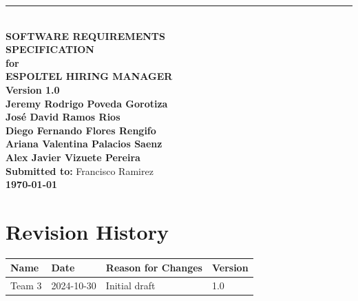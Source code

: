 \documentclass{scrreprt}
\date{November 14, 2024}
\def\myversion{1.0 }
\begin{document}
\begin{titlepage}
    \begin{flushright}
        \rule{16cm}{1.5pt} \\[1cm]
        {\Huge\bfseries SOFTWARE REQUIREMENTS\\ SPECIFICATION}\\[1cm]
        {\LARGE\bfseries for}\\[1cm]
        {\Huge\textbf{ESPOLTEL HIRING MANAGER}}\\[2cm]
        {\Large\textbf{Version \myversion}}\\[1.5cm]
        
        {\Large\textbf{Jeremy Rodrigo Poveda Gorotiza}\\
        \textbf{José David Ramos Rios}\\
        \textbf{Diego Fernando Flores Rengifo}\\
        \textbf{Ariana Valentina Palacios Saenz}\\
        \textbf{Alex Javier Vizuete Pereira}}\\[1.5cm]
        
        {\Large\textbf{Submitted to:} Francisco Ramirez}\\[1.5cm]
        {\Large\textbf{\today}}
    \end{flushright}
    \vfill
\end{titlepage}

\chapter*{Revision History}
\setcounter{page}{1}
\begin{center}
	\begin{tabular}{@{} l l p{6.5cm} l @{}}
		\toprule
		\textbf{Name}    & \textbf{Date}   & \textbf{Reason for Changes} & \textbf{Version} \\ 
		\midrule
		Team 3           & 2024-10-30      & Initial draft               & 1.0              \\
		\bottomrule
	\end{tabular}
\end{center}

\tableofcontents

\listoffigures
\listoftables
\end{document}
